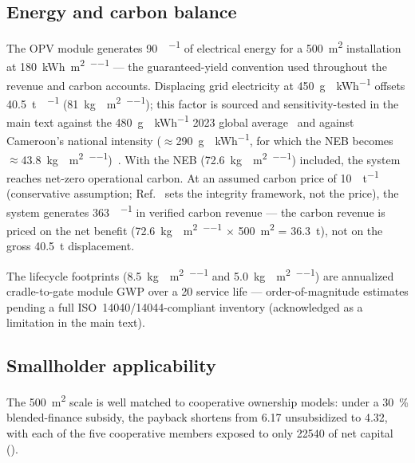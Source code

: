 \documentclass[11pt,a4paper]{article}
\begin{document}
\subsection{Energy and carbon balance}

The OPV module generates \qty{90}{\MWh\per\yr} of electrical energy for a \qty{500}{\m\squared} installation at \qty{180}{\kWh\per\m\squared\per\yr} --- the guaranteed-yield convention used throughout the revenue and carbon accounts. Displacing grid electricity at \qty{450}{\g{}\per\kWh} offsets \qty{40.5}{\tonne{}\per\yr} (\qty{81}{\kg{}\per\m\squared\per\yr}); this factor is sourced and sensitivity-tested in the main text against the \qty{480}{\g{}\per\kWh} 2023 global average~\cite{Ember2024} and against Cameroon's national intensity ($\approx$\qty{290}{\g{}\per\kWh}, for which the NEB becomes $\approx$\qty{43.8}{\kg{}\per\m\squared\per\yr})~\cite{ClimateAnalytics2024}. With the NEB (\qty{72.6}{\kg{}\per\m\squared\per\yr}) included, the system reaches net-zero operational carbon. At an assumed carbon price of \qty{10}{\USD\per\tonne{}} (conservative assumption; Ref.~\cite{ICVCM2024} sets the integrity framework, not the price), the system generates \qty{363}{\USD\per\yr} in verified carbon revenue --- the carbon revenue is priced on the net benefit (\qty{72.6}{\kg{}\per\m\squared\per\yr} $\times$ \qty{500}{\m\squared} = \qty{36.3}{\tonne}), not on the gross \qty{40.5}{\tonne} displacement.

The lifecycle footprints (\qty{8.5}{\kg{}\per\m\squared\per\yr} and \qty{5.0}{\kg{}\per\m\squared\per\yr}) are annualized cradle-to-gate module GWP over a \qty{20}{\yr} service life --- order-of-magnitude estimates pending a full ISO~14040/14044-compliant inventory (acknowledged as a limitation in the main text).

\subsection{Smallholder applicability}

The \qty{500}{\m\squared} scale is well matched to cooperative ownership models: under a \qty{30}{\percent} blended-finance subsidy, the payback shortens from \qty{6.17}{\yr} unsubsidized to \qty{4.32}{\yr}, with each of the five cooperative members exposed to only \qty{22540}{\USD} of net capital ().

\end{document}
